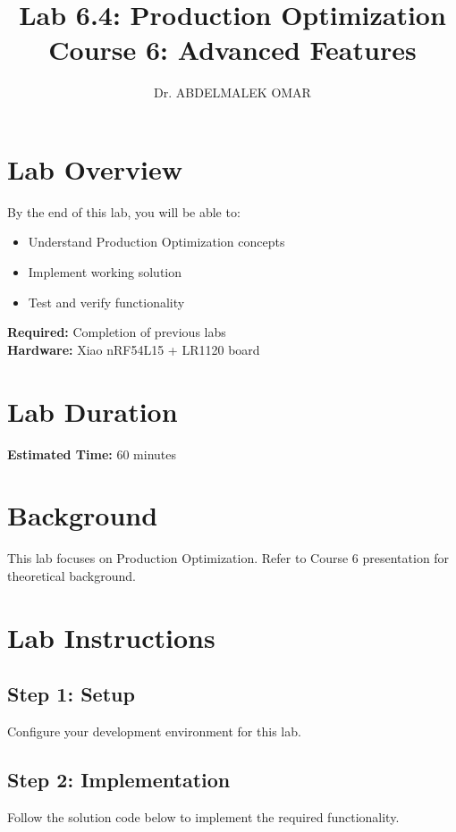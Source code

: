 \documentclass[11pt,a4paper]{article}
\title{\textbf{Lab 6.4: Production Optimization}\\
\large Course 6: Advanced Features}
\author{Dr. ABDELMALEK OMAR}
\date{}
\begin{document}
\maketitle
\thispagestyle{fancy}

\section{Lab Overview}

\begin{objectivebox}
By the end of this lab, you will be able to:
\begin{itemize}
    \item Understand Production Optimization concepts
    \item Implement working solution
    \item Test and verify functionality
\end{itemize}
\end{objectivebox}

\begin{prereqbox}
\textbf{Required:} Completion of previous labs\\
\textbf{Hardware:} Xiao nRF54L15 + LR1120 board
\end{prereqbox}

\section{Lab Duration}
\textbf{Estimated Time:} 60 minutes

\section{Background}

This lab focuses on Production Optimization. Refer to Course 6 presentation for theoretical background.

\section{Lab Instructions}

\subsection{Step 1: Setup}
Configure your development environment for this lab.

\subsection{Step 2: Implementation}
Follow the solution code below to implement the required functionality.
\end{document}

